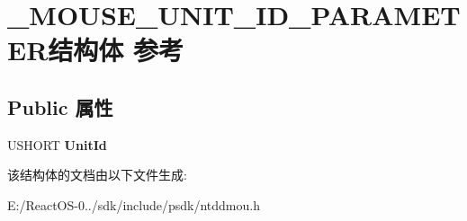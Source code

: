\hypertarget{struct___m_o_u_s_e___u_n_i_t___i_d___p_a_r_a_m_e_t_e_r}{}\section{\+\_\+\+M\+O\+U\+S\+E\+\_\+\+U\+N\+I\+T\+\_\+\+I\+D\+\_\+\+P\+A\+R\+A\+M\+E\+T\+E\+R结构体 参考}
\label{struct___m_o_u_s_e___u_n_i_t___i_d___p_a_r_a_m_e_t_e_r}
\subsection*{Public 属性}
\begin{DoxyCompactItemize}
\item 
\mbox{\label{struct___m_o_u_s_e___u_n_i_t___i_d___p_a_r_a_m_e_t_e_r_affeb36e451bd9771b156c010866332e8}} 
U\+S\+H\+O\+RT {\bfseries Unit\+Id}
\end{DoxyCompactItemize}


该结构体的文档由以下文件生成\+:\begin{DoxyCompactItemize}
\item 
E\+:/\+React\+O\+S-\/0../sdk/include/psdk/ntddmou.\+h\end{DoxyCompactItemize}
